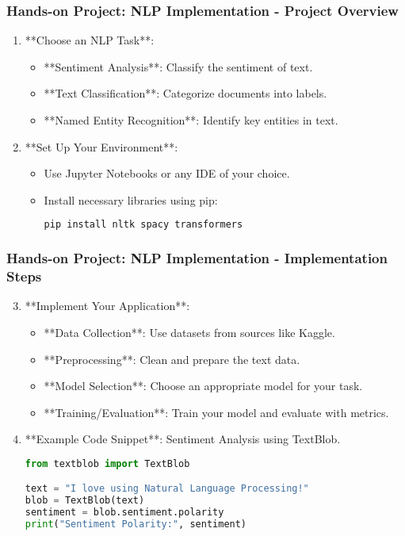 \documentclass[aspectratio=169]{beamer}
\begin{document}
\begin{frame}[fragile]
    \frametitle{Hands-on Project: NLP Implementation - Project Overview}
    \begin{enumerate}
        \item **Choose an NLP Task**: 
        \begin{itemize}
            \item **Sentiment Analysis**: Classify the sentiment of text.
            \item **Text Classification**: Categorize documents into labels.
            \item **Named Entity Recognition**: Identify key entities in text.
        \end{itemize}

        \item **Set Up Your Environment**:
        \begin{itemize}
            \item Use Jupyter Notebooks or any IDE of your choice.
            \item Install necessary libraries using pip:
            \begin{lstlisting}[language=bash]
pip install nltk spacy transformers
            \end{lstlisting}
        \end{itemize}
    \end{enumerate}
\end{frame}

\begin{frame}[fragile]
    \frametitle{Hands-on Project: NLP Implementation - Implementation Steps}
    \begin{enumerate}
        \setcounter{enumi}{2}
        \item **Implement Your Application**:
        \begin{itemize}
            \item **Data Collection**: Use datasets from sources like Kaggle.
            \item **Preprocessing**: Clean and prepare the text data.
            \item **Model Selection**: Choose an appropriate model for your task.
            \item **Training/Evaluation**: Train your model and evaluate with metrics.
        \end{itemize}
    
        \item **Example Code Snippet**: Sentiment Analysis using TextBlob.
        \begin{lstlisting}[language=python]
from textblob import TextBlob

text = "I love using Natural Language Processing!"
blob = TextBlob(text)
sentiment = blob.sentiment.polarity
print("Sentiment Polarity:", sentiment)
        \end{lstlisting}
    \end{enumerate}
\end{frame}
\end{document}
